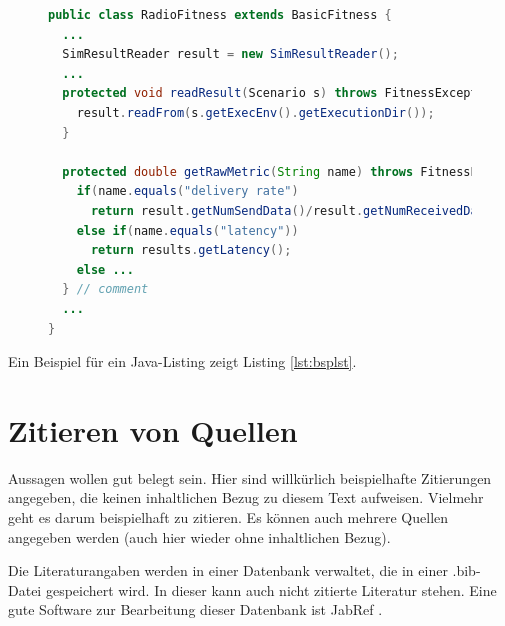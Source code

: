 \begin{figure}[t]
\begin{lstlisting}[language=java, caption={Beispiel für ein Listing},  label=lst:bsplst]
public class RadioFitness extends BasicFitness {
  ...
  SimResultReader result = new SimResultReader();
  ...
  protected void readResult(Scenario s) throws FitnessException {
    result.readFrom(s.getExecEnv().getExecutionDir());
  }

  protected double getRawMetric(String name) throws FitnessException {
    if(name.equals("delivery rate")
      return result.getNumSendData()/result.getNumReceivedData();
    else if(name.equals("latency"))
      return results.getLatency();
    else ...
  } // comment
  ...
}
\end{lstlisting}
\end{figure}


Ein Beispiel für ein Java-Listing zeigt Listing \ref{lst:bsplst}.


\section{Zitieren von Quellen}

Aussagen wollen gut belegt sein.
Hier sind willkürlich \cite{FejF08} beispielhafte Zitierungen \cite{Deming1986} angegeben,
die keinen inhaltlichen Bezug zu diesem Text aufweisen.
Vielmehr geht es darum beispielhaft zu zitieren.
Es können auch mehrere Quellen angegeben werden \cite{biturl,Rost2009} (auch hier wieder ohne inhaltlichen Bezug).

Die Literaturangaben werden in einer Datenbank verwaltet,
die in einer .bib-Datei gespeichert wird.
In dieser kann auch nicht zitierte Literatur stehen.
Eine gute Software zur Bearbeitung dieser Datenbank ist JabRef \cite{jabref}.